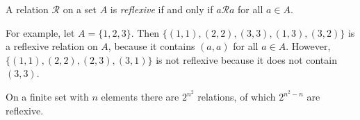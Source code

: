 \documentclass{article}
\begin{document}

A relation $\mathcal{R}$ on a set $A$
is \emph{reflexive} if and only if $a\mathcal{R}a$ for all $a\in A$.

For example, let $A = \{1,2,3\}$.
Then $\{(1,1), (2,2), (3,3), (1,3), (3,2)\}$ is a reflexive relation on $A$,
because it contains $(a,a)$ for all $a \in A$.
However, $\{(1,1), (2,2), (2,3), (3,1)\}$ is not reflexive
because it does not contain $(3,3)$.

On a finite set with $n$ elements there are $2^{n^2}$ relations,
of which $2^{n^2-n}$ are reflexive.
\end{document}
